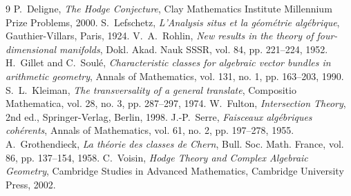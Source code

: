 \documentclass[11pt,reqno]{article}
\theoremstyle{definition}
\begin{document}
\begin{thebibliography}{9}
 P.~Deligne, \emph{The Hodge Conjecture}, Clay Mathematics Institute Millennium Prize Problems, 2000.
 S.~Lefschetz, \emph{L'Analysis situs et la géométrie algébrique}, Gauthier-Villars, Paris, 1924.
 V.~A.~Rohlin, \emph{New results in the theory of four-dimensional manifolds}, Dokl. Akad. Nauk SSSR, vol. 84, pp. 221--224, 1952.
 H.~Gillet and C.~Soulé, \emph{Characteristic classes for algebraic vector bundles in arithmetic geometry}, Annals of Mathematics, vol. 131, no. 1, pp. 163--203, 1990.
 S.~L.~Kleiman, \emph{The transversality of a general translate}, Compositio Mathematica, vol. 28, no. 3, pp. 287--297, 1974.
 W.~Fulton, \emph{Intersection Theory}, 2nd ed., Springer-Verlag, Berlin, 1998.
 J.-P.~Serre, \emph{Faisceaux algébriques cohérents}, Annals of Mathematics, vol. 61, no. 2, pp. 197--278, 1955.
 A.~Grothendieck, \emph{La théorie des classes de Chern}, Bull. Soc. Math. France, vol. 86, pp. 137--154, 1958.
 C.~Voisin, \emph{Hodge Theory and Complex Algebraic Geometry}, Cambridge Studies in Advanced Mathematics, Cambridge University Press, 2002.
\end{thebibliography}
\end{document}
